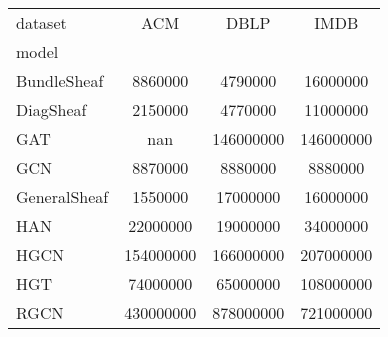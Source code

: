 \begin{tabular}{lSSS}
\toprule
{dataset} & {ACM} & {DBLP} & {IMDB} \\
{model} & {} & {} & {} \\
\midrule
BundleSheaf & 8860000 & 4790000 & 16000000 \\
DiagSheaf & 2150000 & 4770000 & 11000000 \\
GAT & nan & 146000000 & 146000000 \\
GCN & 8870000 & 8880000 & 8880000 \\
GeneralSheaf & 1550000 & 17000000 & 16000000 \\
HAN & 22000000 & 19000000 & 34000000 \\
HGCN & 154000000 & 166000000 & 207000000 \\
HGT & 74000000 & 65000000 & 108000000 \\
RGCN & 430000000 & 878000000 & 721000000 \\
\bottomrule
\end{tabular}
